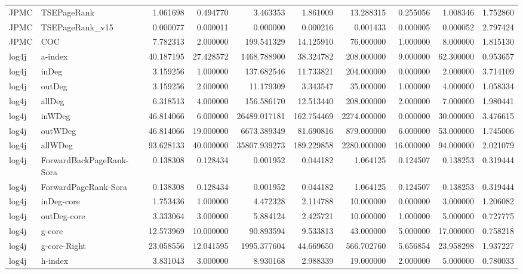 \begin{tabular}{llrrrrrrrr}
JPMC & TSEPageRank & 1.061698 & 0.494770 & 3.463353 & 1.861009 & 13.288315 & 0.255056 & 1.008346 & 1.752860 \\
JPMC & TSEPageRank_v15 & 0.000077 & 0.000011 & 0.000000 & 0.000216 & 0.001433 & 0.000005 & 0.000052 & 2.797424 \\
JPMC & COC & 7.782313 & 2.000000 & 199.541329 & 14.125910 & 76.000000 & 1.000000 & 8.000000 & 1.815130 \\
log4j & a-index & 40.187195 & 27.428572 & 1468.788900 & 38.324782 & 208.000000 & 9.000000 & 62.300000 & 0.953657 \\
log4j & inDeg & 3.159256 & 1.000000 & 137.682546 & 11.733821 & 204.000000 & 0.000000 & 2.000000 & 3.714109 \\
log4j & outDeg & 3.159256 & 2.000000 & 11.179309 & 3.343547 & 35.000000 & 1.000000 & 4.000000 & 1.058334 \\
log4j & allDeg & 6.318513 & 4.000000 & 156.586170 & 12.513440 & 208.000000 & 2.000000 & 7.000000 & 1.980441 \\
log4j & inWDeg & 46.814066 & 6.000000 & 26489.017181 & 162.754469 & 2274.000000 & 0.000000 & 30.000000 & 3.476615 \\
log4j & outWDeg & 46.814066 & 19.000000 & 6673.389349 & 81.690816 & 879.000000 & 6.000000 & 53.000000 & 1.745006 \\
log4j & allWDeg & 93.628133 & 40.000000 & 35807.939273 & 189.229858 & 2280.000000 & 16.000000 & 94.000000 & 2.021079 \\
log4j & ForwardBackPageRank-Sora & 0.138308 & 0.128434 & 0.001952 & 0.044182 & 1.064125 & 0.124507 & 0.138253 & 0.319444 \\
log4j & ForwardPageRank-Sora & 0.138308 & 0.128434 & 0.001952 & 0.044182 & 1.064125 & 0.124507 & 0.138253 & 0.319444 \\
log4j & inDeg-core & 1.753436 & 1.000000 & 4.472328 & 2.114788 & 10.000000 & 0.000000 & 3.000000 & 1.206082 \\
log4j & outDeg-core & 3.333064 & 3.000000 & 5.884124 & 2.425721 & 10.000000 & 1.000000 & 5.000000 & 0.727775 \\
log4j & g-core & 12.573969 & 10.000000 & 90.893594 & 9.533813 & 43.000000 & 5.000000 & 17.000000 & 0.758218 \\
log4j & g-core-Right & 23.058556 & 12.041595 & 1995.377604 & 44.669650 & 566.702760 & 5.656854 & 23.958298 & 1.937227 \\
log4j & h-index & 3.831043 & 3.000000 & 8.930168 & 2.988339 & 19.000000 & 2.000000 & 5.000000 & 0.780033 \\

\end{tabular}
